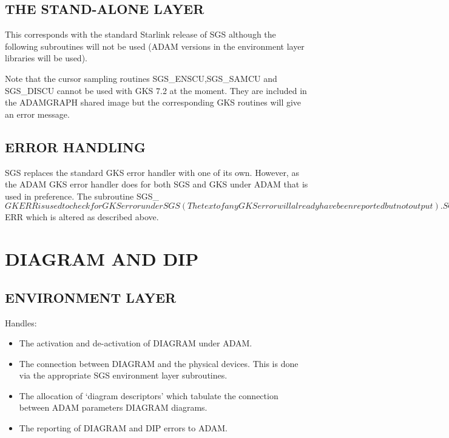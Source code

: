 \subsection{THE STAND-ALONE LAYER}
This corresponds with the standard Starlink release of SGS although the
following subroutines will not be used (ADAM versions in the environment
layer libraries will be used).
Note that the cursor sampling routines SGS\_ENSCU,SGS\_SAMCU and SGS\_DISCU
cannot be used with GKS 7.2 at the moment. They are included in the
ADAMGRAPH shared image but the corresponding GKS routines will give an
error message.

\subsection{ERROR HANDLING}
SGS replaces the standard GKS error handler with one of
its own. However, as the ADAM GKS error handler does for both SGS and GKS
under ADAM that is used in preference. 
The subroutine SGS\_$GKERR is used to check for GKS error under SGS (The
text of any GKS error will already have been reported but not output).
SGS errors are reported via subroutine SGS\_$ERR which is altered as described
above.

\section{DIAGRAM AND DIP}

\subsection{ENVIRONMENT LAYER}
Handles:
\begin{itemize}
\item The activation and de-activation of DIAGRAM under ADAM.
\item The connection between DIAGRAM and the physical devices. This is done
via the appropriate SGS environment layer subroutines.
\item The allocation of `diagram descriptors' which tabulate the connection 
between ADAM parameters DIAGRAM diagrams.
\item The reporting of DIAGRAM and DIP errors to ADAM.
\end{itemize}

